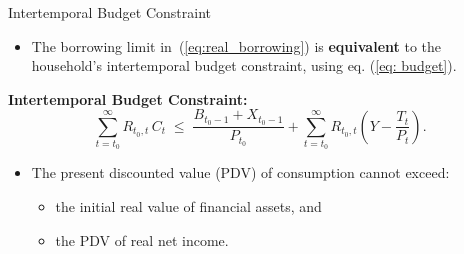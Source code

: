 \documentclass[11pt,aspectratio=169]{beamer}
\begin{document}
\begin{frame}[label=borrowing]{Intertemporal Budget Constraint}
\small

\begin{itemize}
  \item The borrowing limit in~(\ref{eq:real_borrowing}) is \textbf{equivalent} to the household’s intertemporal budget constraint, using eq. (\ref{eq: budget}).
\end{itemize}

\vspace{0.25cm}
\noindent\textbf{Intertemporal Budget Constraint:}
\begin{equation}
\sum_{t=t_{0}}^{\infty} R_{t_{0},t}\,C_{t}
\;\leq\;
\frac{B_{t_{0}-1}+X_{t_{0}-1}}{P_{t_{0}}}
+\sum_{t=t_{0}}^{\infty} R_{t_{0},t}\!\left(Y - \frac{T_{t}}{P_{t}}\right).
\label{eq:borrowing}
\end{equation}

\begin{itemize}
  \item The present discounted value (PDV) of consumption cannot exceed:
  \begin{itemize}
    \item the initial real value of financial assets, and
    \item the PDV of real net income.
  \end{itemize}
\end{itemize}

\vspace{0.3cm}
\begin{center}
  \hyperlink{borrowing_proof}{}
\end{center}

\end{frame}
\end{document}
